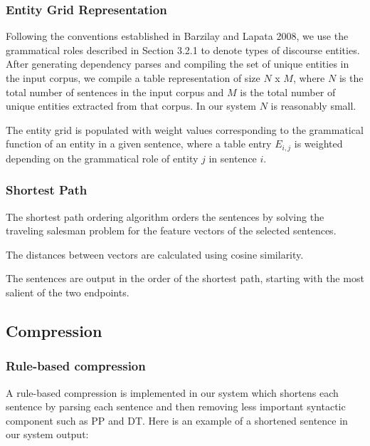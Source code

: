 \documentclass[11pt]{article}
\begin{document}
\subsubsection{Entity Grid Representation}
Following the conventions established in Barzilay and Lapata 2008, we use the grammatical roles described in Section 3.2.1 to denote types of discourse entities. After generating dependency parses and compiling the set of unique entities in the input corpus, we compile a table representation of size $N$ x $M$, where $N$ is the total number of sentences in the input corpus and $M$ is the total number of unique entities extracted from that corpus. In our system $N$ is reasonably small.

The entity grid is populated with weight values corresponding to the grammatical function of an entity in a given sentence, where a table entry $E_{i,j}$ is weighted depending on the grammatical role of entity $j$ in sentence $i$. 


\subsubsection{Shortest Path}
The shortest path ordering algorithm orders the sentences by solving the traveling salesman problem for the feature vectors of the selected sentences. 

The distances between vectors are calculated using cosine similarity.

The sentences are output in the order of the shortest path, starting with the most salient of the two endpoints.

\subsection{Compression}

\subsubsection{Rule-based compression}
A rule-based compression is implemented in our system which shortens each sentence by parsing each sentence and then removing less important syntactic component such as PP and DT. Here is an example of a shortened sentence in our system output:
\\

\\
\end{document}
